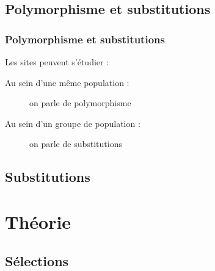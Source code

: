 \subsection{Polymorphisme et substitutions}
\begin{frame}
    \frametitle{Polymorphisme et substitutions}
   
    \begin{block}{Les sites peuvent s'étudier :}
        \begin{description}
            \item [Au sein d’une même population :] on parle de polymorphisme
            \item [Au sein d’un groupe de population :] on parle de substitutions 
        \end{description}
    \end{block}
    
    


\end{frame}

\subsection{Substitutions}
\begin{frame}
    

\end{frame}

\section{Théorie}
\begin{frame}
	\tableofcontents[sectionstyle=show/shaded,subsectionstyle=show/show/hide,subsubsectionstyle=show/show/hide]
\end{frame}

\subsection{Sélections}

